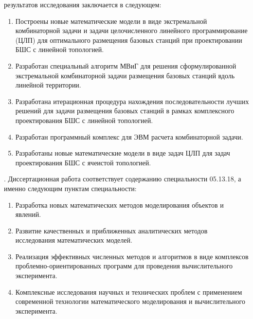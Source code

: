 {\novelty} результатов исследования заключается в следующем:
\begin{enumerate}[beginpenalty=10000] %
  \item Построены новые математические модели в виде экстремальной комбинаторной задачи и задачи целочисленного линейного программирование (ЦЛП) для оптимального размещения базовых станций при проектировании БШС с линейной топологией.  
  \item Разработан специальный алгоритм МВиГ для решения сформулированной экстремальной комбинаторной задачи размещения базовых станций вдоль линейной территории.
  \item Разработана итерационная процедура нахождения последовательности лучших решений для задачи размещения базовых станций в рамках комплексного проектирования БШС с линейной топологией.
  \item Разработан программный комплекс для ЭВМ расчета комбинаторной задачи.
  \item Разработаны новые математические модели в виде задач ЦЛП для задач проектирования БШС с ячеистой топологией.
\end{enumerate}

{\fieldresearch}. Диссертационная работа соответствует содержанию специальности 05.13.18, а именно следующим пунктам специальности:
\begin{enumerate}
    \item Разработка новых математических методов моделирования объектов и явлений.
    \item Развитие качественных и приближенных аналитических методов исследования математических моделей.
    \item Реализация эффективных численных методов и алгоритмов в виде комплексов проблемно-ориентированных программ для проведения вычислительного эксперимента.
    \item Комплексные исследования научных и технических проблем с применением современной технологии математического моделирования и вычислительного эксперимента.
\end{enumerate}

